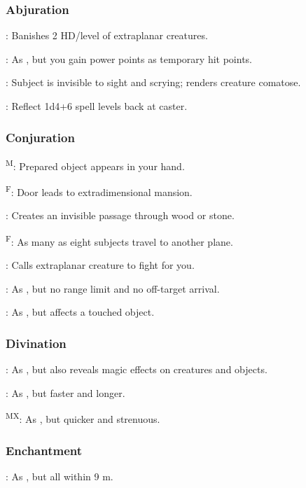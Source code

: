 \subsubsection{Abjuration}
	: Banishes 2 HD/level of extraplanar creatures.

	: As , but you gain power points as temporary hit points.

	: Subject is invisible to sight and scrying; renders creature comatose.

	: Reflect 1d4+6 spell levels back at caster.

\subsubsection{Conjuration}
	\textsuperscript{M}: Prepared object appears in your hand.

	\textsuperscript{F}: Door leads to extradimensional mansion.

	: Creates an invisible passage through wood or stone.

	\textsuperscript{F}: As many as eight subjects travel to another plane.

	: Calls extraplanar creature to fight for you.

	: As , but no range limit and no off-target arrival.

	: As , but affects a touched object.

\subsubsection{Divination}
	: As , but also reveals magic effects on creatures and objects.

	: As , but faster and longer.

	\textsuperscript{MX}: As , but quicker and strenuous.

\subsubsection{Enchantment}
	: As , but all within 9 m.

